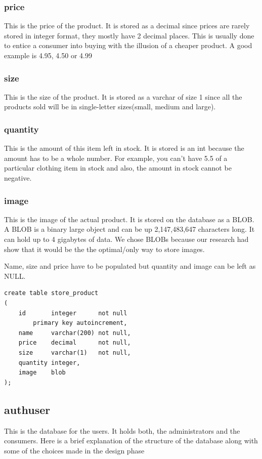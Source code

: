 \subsubsection{price}
This is the price of the product. It is stored as a decimal since prices are rarely stored in integer format, they mostly have 2 decimal places. This is usually done to entice a consumer into buying with the illusion of a cheaper product. A good example is 4.95, 4.50 or 4.99
\subsubsection{size}
This is the size of the product. It is stored as a varchar of size 1 since all the products sold will be in single-letter sizes(small, medium and large).
\subsubsection{quantity}
This is the amount of this item left in stock. It is stored is an int because the amount has to be a whole number. For example, you can't have 5.5 of a particular clothing item in stock and also, the amount in stock cannot be negative.
\subsubsection{image}
This is the image of the actual product. It is stored on the database as a BLOB. A BLOB is a binary large object and can be up 2,147,483,647 characters long. It can hold up to 4 gigabytes of data. We chose BLOBs because our research had show that it would be the the optimal/only way to store images.

Name, size and price have to be populated but quantity and image can be left as NULL.

\begin{verbatim}
create table store_product
(
    id       integer      not null
        primary key autoincrement,
    name     varchar(200) not null,
    price    decimal      not null,
    size     varchar(1)   not null,
    quantity integer,
    image    blob
);
\end{verbatim}

\subsection{auth\textunderscore user}
This is the database for the users. It holds both, the administrators and the consumers. Here is a brief explanation of the structure of the database along with some of the choices made in the design phase

